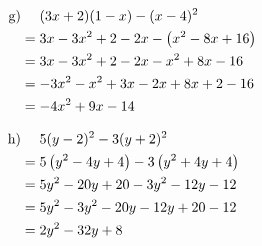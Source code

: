 \begin{exercise}
{\begin{equation*}
      \end{equation*}
    }%
    \newcommand{\solutionG}
    {%
      \begin{equation*}
        \begin{split}
          \toprow{\text{g)}}{(3x+2)(1-x)-(x-4)^2} \\
          &=3x-3x^2+2-2x-\left(x^2-8x+16\right)   \\
          &=3x-3x^2+2-2x-x^2+8x-16                \\
          &=-3x^2-x^2+3x-2x+8x+2-16               \\
          &=-4x^2+9x-14
        \end{split}
      \end{equation*}
    }%
    \newcommand{\solutionH}
    {%
      \begin{equation*}
        \begin{split}
          \toprow{\text{h)}}{5(y-2)^2-3(y+2)^2}           \\
          &=5\left(y^2-4y+4\right)-3\left(y^2+4y+4\right) \\
          &=5y^2-20y+20-3y^2-12y-12                       \\
          &=5y^2-3y^2-20y-12y+20-12                       \\
          &=2y^2-32y+8
        \end{split}
      \end{equation*}
    }%

    \begin{minipage}[t]{0.49\textwidth}
      \small
      \solutionA
    \end{minipage}%
    \hfill
    \begin{minipage}[t]{0.49\textwidth}
      \small
      \solutionB
    \end{minipage}%

    \begin{minipage}[t]{0.49\textwidth}
      \small
      \solutionC
    \end{minipage}%
    \hfill
    \begin{minipage}[t]{0.49\textwidth}
      \small
      \solutionD
    \end{minipage}%

    \begin{minipage}[t]{0.49\textwidth}
      \small
      \solutionE
    \end{minipage}%
    \hfill
    \begin{minipage}[t]{0.49\textwidth}
      \small
      \solutionF
    \end{minipage}%

    \begin{minipage}[t]{0.49\textwidth}
      \small
      \solutionG
    \end{minipage}%
    \hfill
    \begin{minipage}[t]{0.49\textwidth}
      \small
      \solutionH
    \end{minipage}%

  \fi
\end{exercise}
